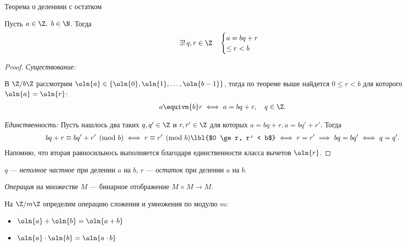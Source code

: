 \begin{follow}
    Теорема о делениии с остатком
    
    Пусть $a \in \Z,~b \in \N$. Тогда 
    \begin{gather*}
        \exists!\,q, r \in \Z \quad \begin{cases}a = bq + r \\ \leq r < b\end{cases}
    \end{gather*}
\end{follow}

\begin{proof}

    \textsl{Существование:}

    В $\Z/b\Z$ рассмотрим $\oln{a} \in \{\oln{0}, \oln{1}, \ldots, \oln{b-1}\}$, тогда по теореме выше найдется $0 \leq r < b$ для которого $\oln{a} = \oln{r}$:
    \begin{gather*}
        a \equivm{b} r \iff a = bq + r, \quad q \in \Z.
    \end{gather*}

    \textsl{Единственность:}
    Пусть нашлось два таких $q, q' \in \Z$ и $r, r' \in \Z$ для которых $a = bq + r, a = bq' + r'$. Тогда
    \begin{gather*}
        bq+r \equiv bq'+r' \pmod{b} \iff r \equiv r' \pmod{b} \lbl{$0 \ge r, r' < b$}\iff r = r' \implies bq = bq' \iff q = q'.
    \end{gather*}
    Напомню, что вторая равносильнось выполняется благодаря единственности класса вычетов $\oln{r}$.
\end{proof}

\begin{defn}
    $q$ --- \emph{неполное частное} при делении $a$ на $b$, $r$ --- \emph{остаток} при делении $a$ на $b$.
\end{defn}

\begin{defn}
    \emph{Операция} на множестве $M$ --- бинарное отображение $M \times M \to M$.
\end{defn}

На $\Z/m\Z$ определим операцию сложения и умножения по модулю $m$:

\begin{itemize}
    \item $\oln{a} + \oln{b} = \oln{a + b}$
    
    \item $\oln{a} \cdot \oln{b} = \oln{a \cdot b}$
\end{itemize}

